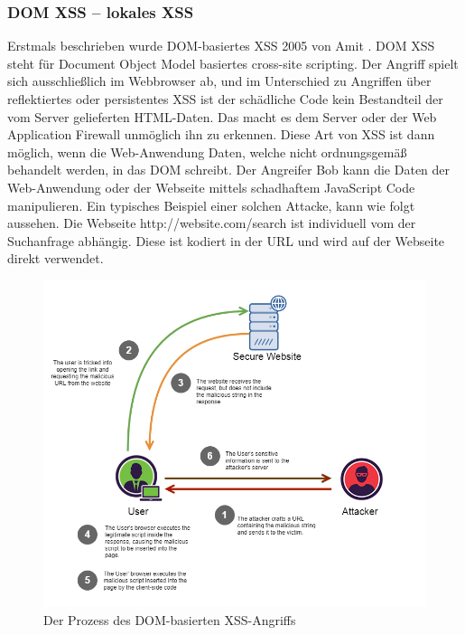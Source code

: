 \subsubsection{DOM XSS – lokales XSS}
\label{subsubsection:dom_xss}

Erstmals beschrieben wurde DOM-basiertes XSS 2005 von Amit \textcite{klein2005}. DOM XSS steht für Document Object Model basiertes cross-site scripting. Der Angriff spielt sich ausschließlich im Webbrowser ab, und im Unterschied zu Angriffen über reflektiertes oder persistentes XSS ist der schädliche Code kein Bestandteil der vom Server gelieferten HTML-Daten. Das macht es dem Server oder der Web Application Firewall unmöglich ihn zu erkennen. Diese Art von XSS ist dann möglich, wenn die Web-Anwendung Daten, welche nicht ordnungsgemäß behandelt werden, in das DOM schreibt.
Der Angreifer Bob kann die Daten der Web-Anwendung oder der Webseite mittels schadhaftem JavaScript Code manipulieren.  Ein typisches Beispiel einer solchen Attacke, kann wie folgt aussehen. Die Webseite http://website.com/search ist individuell vom der Suchanfrage abhängig. Diese ist kodiert in der URL und wird auf der Webseite direkt verwendet.

\begin{figure}[ht]
	\centering
	\includegraphics[width=1\linewidth]{images/medium/3_dom_xss.png}
	\caption[Der Prozess des DOM-basierten XSS-Angriffs]
	{Der Prozess des DOM-basierten XSS-Angriffs \autocite{makarem2018}}
\end{figure}


